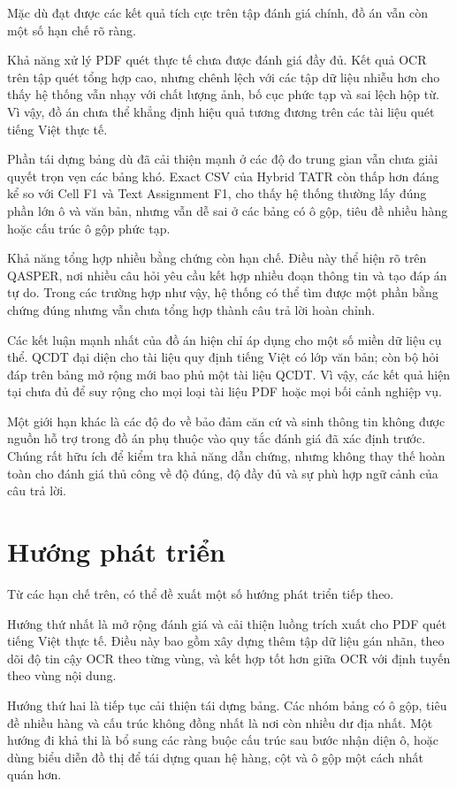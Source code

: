 \documentclass[../DoAn.tex]{subfiles}
\begin{document}
Mặc dù đạt được các kết quả tích cực trên tập đánh giá chính, đồ án vẫn còn một số
hạn chế rõ ràng.

Khả năng xử lý PDF quét thực tế chưa được đánh giá đầy đủ. Kết quả OCR
trên tập quét tổng hợp cao, nhưng chênh lệch với các tập dữ liệu nhiễu hơn cho thấy
hệ thống vẫn nhạy với chất lượng ảnh, bố cục phức tạp và sai lệch hộp từ. Vì vậy,
đồ án chưa thể khẳng định hiệu quả tương đương trên các tài liệu quét tiếng Việt
thực tế.

Phần tái dựng bảng dù đã cải thiện mạnh ở các độ đo trung gian vẫn chưa
giải quyết trọn vẹn các bảng khó. Exact CSV của Hybrid TATR còn thấp hơn đáng
kể so với Cell F1 và Text Assignment F1, cho thấy hệ thống thường lấy đúng phần
lớn ô và văn bản, nhưng vẫn dễ sai ở các bảng có ô gộp, tiêu đề nhiều hàng hoặc
cấu trúc ô gộp phức tạp.

Khả năng tổng hợp nhiều bằng chứng còn hạn chế. Điều này thể hiện rõ trên
QASPER, nơi nhiều câu hỏi yêu cầu kết hợp nhiều đoạn thông tin và tạo đáp án tự
do. Trong các trường hợp như vậy, hệ thống có thể tìm được một phần bằng chứng
đúng nhưng vẫn chưa tổng hợp thành câu trả lời hoàn chỉnh.

Các kết luận mạnh nhất của đồ án hiện chỉ áp dụng cho một số miền dữ liệu
cụ thể. QCDT đại diện cho tài liệu quy định tiếng Việt có lớp văn bản; còn bộ hỏi
đáp trên bảng mở rộng mới bao phủ một tài liệu QCDT.
Vì vậy, các kết quả hiện tại chưa đủ để suy rộng cho mọi loại tài liệu PDF hoặc mọi
bối cảnh nghiệp vụ.

Một giới hạn khác là các độ đo về bảo đảm căn cứ và sinh thông tin không được nguồn hỗ trợ trong đồ án phụ thuộc vào quy
tắc đánh giá đã xác định trước. Chúng rất hữu ích để kiểm tra khả năng dẫn chứng,
nhưng không thay thế hoàn toàn cho đánh giá thủ công về độ đúng, độ đầy đủ và sự
phù hợp ngữ cảnh của câu trả lời.

\section{Hướng phát triển}
\label{section:future-work}

Từ các hạn chế trên, có thể đề xuất một số hướng phát triển tiếp theo.

Hướng thứ nhất là mở rộng đánh giá và cải thiện luồng trích xuất cho PDF quét tiếng Việt
thực tế. Điều này bao gồm xây dựng thêm tập dữ liệu gán nhãn, theo dõi độ tin cậy
OCR theo từng vùng, và kết hợp tốt hơn giữa OCR với định tuyến theo vùng nội
dung.

Hướng thứ hai là tiếp tục cải thiện tái dựng bảng. Các nhóm bảng có ô gộp, tiêu đề
nhiều hàng và cấu trúc không đồng nhất là nơi còn nhiều dư địa nhất. Một hướng đi
khả thi là bổ sung các ràng buộc cấu trúc sau bước nhận diện ô, hoặc dùng biểu diễn
đồ thị để tái dựng quan hệ hàng, cột và ô gộp một cách nhất quán hơn.
\end{document}
